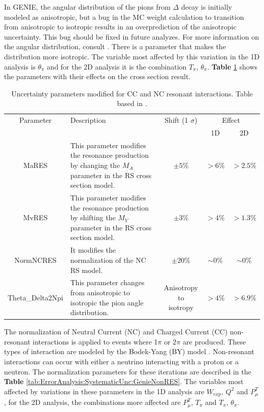In GENIE, the angular distribution of the pions from $\Delta$ decay is initially modeled as anisotropic, but a bug in the MC weight calculation to transition from anisotropic to isotropic results in an overprediction of the anisotropic uncertainty. This bug should be fixed in future analyzes. For more information on the angular distribution, consult \cite{Genie}. There is a parameter that makes the distribution more isotropic. The variable most affected by this variation in the 1D analysis is $\theta_\pi$ and for the 2D analysis it is the combination $T_\pi$, $\theta_\pi$. \textbf{Table} \ref{tab:ErrorAnalysis:SystematicUnc:GenieRESmodels} shows the parameters with their effects on the cross section result.

\begin{table}[!htb]
    \centering
    \begin{tabular}{c|p{1.8in}|c|c|c}
        \hline 
        Parameter & Description  & Shift (1 $\sigma$) & \multicolumn{2}{c}{Effect} \\
         & & & 1D & 2D \\
        \hline 
        MaRES & This parameter modifies the resonance production by changing the $M_A$ parameter in the RS cross section model. & $\pm5\%$ & $>6\%$ & $>2.5\%$ \\ \hline
        MvRES & This parameter modifies the resonance production by shifting the $M_V$ parameter in the RS cross section model. & $\pm3\%$ & $>4\%$ & $>1.3\%$\\ \hline
        NormNCRES & It modifies the normalization of the NC RS model. & $\pm20\%$ & $\sim 0\%$ & $\sim0\%$ \\ \hline
        Theta\_Delta2Npi & This parameter changes from anisotropic to isotropic the pion angle distribution. & \makecell{Anisotropy to \\ isotropy} & $>4\%$ & $>6.9\%$ \\ \hline
    \end{tabular}
    \caption{Uncertainty parameters modified for CC and NC resonant interactions. Table based in \cite{GENIEUnc}.}
    \label{tab:ErrorAnalysis:SystematicUnc:GenieRESmodels}
\end{table}

The normalization of Neutral Current (NC) and Charged Current (CC) non-resonant interactions is applied to events where 1$\pi$ or 2$\pi$ are produced. These types of interaction are modeled by the Bodek-Yang (BY) model \cite{Yang_2009}. Non-resonant interactions can occur with either a neutrino interacting with a proton or a neutron. The normalization parameters for these iterations are described in the \textbf{Table} \ref{tab:ErrorAnalysis:SystematicUnc:GenieNonRES}. The variables most affected by variations in these parameters in the 1D analysis are $W_{exp}$, $Q^2$ and $P^T_\mu$, for the 2D analysis, the combinations more affected are $P^T_\mu$, $T_\pi$ and $T_\pi$, $\theta_\pi$.

